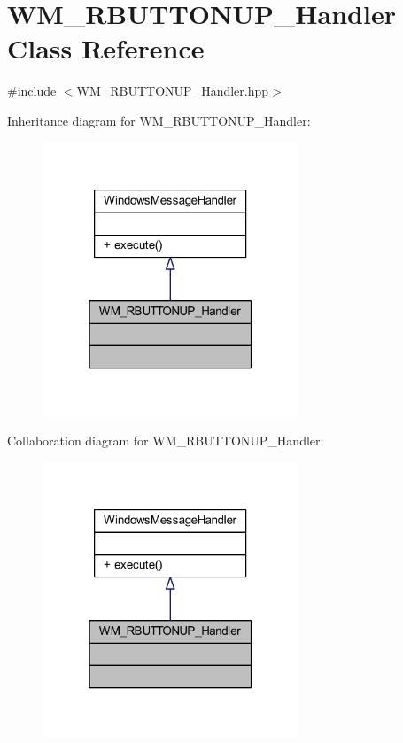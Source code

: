 \hypertarget{class_w_m___r_b_u_t_t_o_n_u_p___handler}{}\section{W\+M\+\_\+\+R\+B\+U\+T\+T\+O\+N\+U\+P\+\_\+\+Handler Class Reference}
\label{class_w_m___r_b_u_t_t_o_n_u_p___handler}


{\ttfamily \#include $<$W\+M\+\_\+\+R\+B\+U\+T\+T\+O\+N\+U\+P\+\_\+\+Handler.\+hpp$>$}



Inheritance diagram for W\+M\+\_\+\+R\+B\+U\+T\+T\+O\+N\+U\+P\+\_\+\+Handler\+:\nopagebreak
\begin{figure}[H]
\begin{center}
\leavevmode
\includegraphics[width=217pt]{class_w_m___r_b_u_t_t_o_n_u_p___handler__inherit__graph}
\end{center}
\end{figure}


Collaboration diagram for W\+M\+\_\+\+R\+B\+U\+T\+T\+O\+N\+U\+P\+\_\+\+Handler\+:\nopagebreak
\begin{figure}[H]
\begin{center}
\leavevmode
\includegraphics[width=217pt]{class_w_m___r_b_u_t_t_o_n_u_p___handler__coll__graph}
\end{center}
\end{figure}
